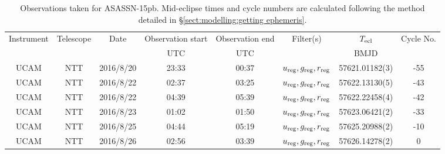 \begin{table}
	\begin{center}
		\caption{Observations taken for ASASSN-15pb. Mid-eclipse times and cycle numbers are calculated following the method detailed in \S\ref{sect:modelling:getting ephemeris}.}
		\label{table:observing:observation logs ASASSN-15pb}
		\begin{tabular}{cccccccc}
			\hline
			Instrument & Telescope & Date & Observation start & Observation end & Filter(s) & $T_{\rm ecl}$ & Cycle No. \\
			 &  &  & UTC & UTC &  & BMJD &  \\
			\hline
			\hline
			UCAM & NTT & 2016/8/20 & 23:33 & 00:37 & $u_{\rm reg},g_{\rm reg},r_{\rm reg}$ & 57621.01182(3) & -55 \\
			UCAM & NTT & 2016/8/22 & 02:37 & 03:25 & $u_{\rm reg},g_{\rm reg},r_{\rm reg}$ & 57622.13130(5) & -43 \\
			UCAM & NTT & 2016/8/22 & 04:39 & 05:39 & $u_{\rm reg},g_{\rm reg},r_{\rm reg}$ & 57622.22458(4) & -42 \\
			UCAM & NTT & 2016/8/23 & 01:02 & 01:50 & $u_{\rm reg},g_{\rm reg},r_{\rm reg}$ & 57623.06421(2) & -33 \\
			UCAM & NTT & 2016/8/25 & 04:44 & 05:19 & $u_{\rm reg},g_{\rm reg},r_{\rm reg}$ & 57625.20988(2) & -10 \\
			UCAM & NTT & 2016/8/26 & 02:56 & 03:39 & $u_{\rm reg},g_{\rm reg},r_{\rm reg}$ & 57626.14278(2) &   0 \\
		   \hline
		\end{tabular}
	\end{center}
\end{table}